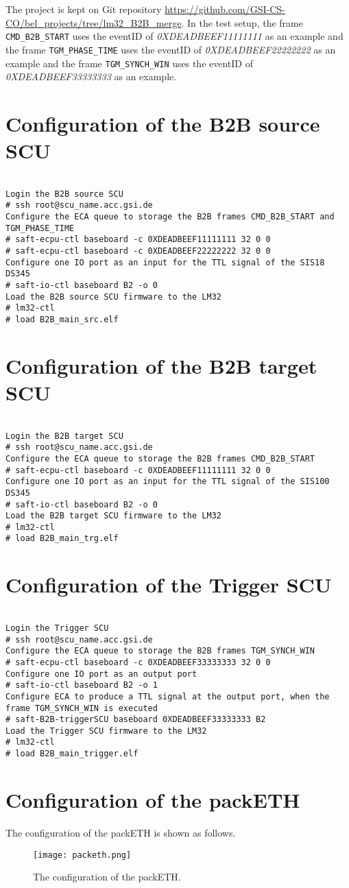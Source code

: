 \label{appendix_conf}
The project is kept on Git repository \url{https://github.com/GSI-CS-CO/bel_projects/tree/lm32_B2B_merge}. In the test setup, the frame \verb|CMD_B2B_START| uses the eventID of \textit{0XDEADBEEF11111111} as an example and the frame \verb|TGM_PHASE_TIME| uses the eventID of \textit{0XDEADBEEF22222222} as an example and the frame \verb|TGM_SYNCH_WIN| uses the eventID of \textit{0XDEADBEEF33333333} as an example.

\section{Configuration of the B2B source SCU}
\begin{lstlisting}[frame=single]  % Start your code-block

Login the B2B source SCU
# ssh root@scu_name.acc.gsi.de
Configure the ECA queue to storage the B2B frames CMD_B2B_START and TGM_PHASE_TIME
# saft-ecpu-ctl baseboard -c 0XDEADBEEF11111111 32 0 0
# saft-ecpu-ctl baseboard -c 0XDEADBEEF22222222 32 0 0
Configure one IO port as an input for the TTL signal of the SIS18 DS345
# saft-io-ctl baseboard B2 -o 0
Load the B2B source SCU firmware to the LM32
# lm32-ctl
# load B2B_main_src.elf
\end{lstlisting}
\section{Configuration of the B2B target SCU}
\begin{lstlisting}[frame=single]  % Start your code-block

Login the B2B target SCU
# ssh root@scu_name.acc.gsi.de
Configure the ECA queue to storage the B2B frames CMD_B2B_START
# saft-ecpu-ctl baseboard -c 0XDEADBEEF11111111 32 0 0
Configure one IO port as an input for the TTL signal of the SIS100 DS345
# saft-io-ctl baseboard B2 -o 0
Load the B2B target SCU firmware to the LM32
# lm32-ctl
# load B2B_main_trg.elf
\end{lstlisting}
\section{Configuration of the Trigger SCU}
\begin{lstlisting}[frame=single]  % Start your code-block

Login the Trigger SCU
# ssh root@scu_name.acc.gsi.de
Configure the ECA queue to storage the B2B frames TGM_SYNCH_WIN
# saft-ecpu-ctl baseboard -c 0XDEADBEEF33333333 32 0 0
Configure one IO port as an output port
# saft-io-ctl baseboard B2 -o 1
Configure ECA to produce a TTL signal at the output port, when the frame TGM_SYNCH_WIN is executed
# saft-B2B-triggerSCU baseboard 0XDEADBEEF33333333 B2
Load the Trigger SCU firmware to the LM32
# lm32-ctl
# load B2B_main_trigger.elf
\end{lstlisting}
\section{Configuration of the packETH}
The configuration of the packETH is shown as follows. 
\begin{figure}[!htb]
   \centering   
   \texttt{[image: packeth.png]}
   \caption{The configuration of the packETH.}
   \label{packeth}
\end{figure}